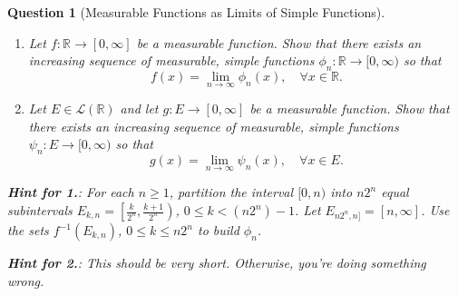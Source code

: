 \documentclass[notoc,notitlepage]{tufte-book}
\newtheorem{assgprob}{Question}[section]
\begin{document}
\begin{assgprob}[Measurable Functions as Limits of Simple Functions]
  \begin{enumerate}
    \item Let $f : \mathbb{R} \to [0, \infty]$ be a measurable function.
      Show that there exists an increasing sequence of measurable,
      simple functions $\phi_n : \mathbb{R} \to [0, \infty)$ so that
      \begin{equation*}
        f(x) = \lim_{n \to \infty} \phi_n(x),\quad \forall x \in \mathbb{R}.
      \end{equation*}
    \item Let $E \in \mathcal{L}(\mathbb{R})$ and let
      $g : E \to [0, \infty]$ be a measurable function.
      Show that there exists an increasing sequence of measurable,
      simple functions $\psi_n : E \to [0, \infty)$ so that
      \begin{equation*}
        g(x) = \lim_{n \to \infty} \psi_n(x),\quad \forall x \in E.
      \end{equation*}
  \end{enumerate}

  \noindent
  \textbf{Hint for 1.}: For each $n \geq 1$, partition the interval $[0, n)$ 
  into $n 2^n$ equal subintervals $E_{k, n} = \left[ \frac{k}{2^n},
  \frac{k+1}{2^n} \right)$, $0 \leq k < (n 2^n) - 1$.
  Let $E_{n 2^n, n]} = [n, \infty]$.
  Use the sets $f^{-1}(E_{k, n})$, $0 \leq k \leq n 2^n$ to build $\phi_n$.

  \noindent
  \textbf{Hint for 2.}: This should be very short. Otherwise, you're doing
  something wrong.
\end{assgprob}
\end{document}
